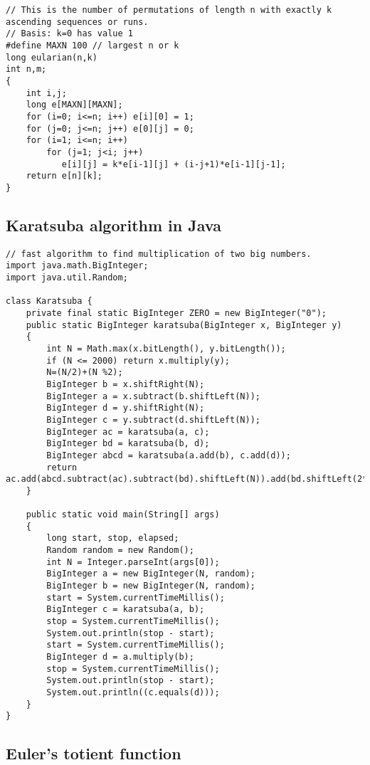 \documentclass[a4paper]{article}
\begin{document}
\begin{verbatim}
// This is the number of permutations of length n with exactly k ascending sequences or runs.
// Basis: k=0 has value 1
#define MAXN 100 // largest n or k
long eularian(n,k)
int n,m;
{
    int i,j;
    long e[MAXN][MAXN];
    for (i=0; i<=n; i++) e[i][0] = 1;
    for (j=0; j<=n; j++) e[0][j] = 0;
    for (i=1; i<=n; i++)
        for (j=1; j<i; j++)
           e[i][j] = k*e[i-1][j] + (i-j+1)*e[i-1][j-1];
    return e[n][k];
}
\end{verbatim}

\subsection{Karatsuba algorithm in Java}

\begin{verbatim}
// fast algorithm to find multiplication of two big numbers.
import java.math.BigInteger;
import java.util.Random;

class Karatsuba {
	private final static BigInteger ZERO = new BigInteger("0");
	public static BigInteger karatsuba(BigInteger x, BigInteger y)
	{
		int N = Math.max(x.bitLength(), y.bitLength());
		if (N <= 2000) return x.multiply(y);
		N=(N/2)+(N %2);
		BigInteger b = x.shiftRight(N);
		BigInteger a = x.subtract(b.shiftLeft(N));
		BigInteger d = y.shiftRight(N);
		BigInteger c = y.subtract(d.shiftLeft(N));
		BigInteger ac = karatsuba(a, c);
		BigInteger bd = karatsuba(b, d);
		BigInteger abcd = karatsuba(a.add(b), c.add(d));
		return ac.add(abcd.subtract(ac).subtract(bd).shiftLeft(N)).add(bd.shiftLeft(2*N));
	}
	
	public static void main(String[] args)
	{
		long start, stop, elapsed;
		Random random = new Random();
		int N = Integer.parseInt(args[0]);
		BigInteger a = new BigInteger(N, random);
		BigInteger b = new BigInteger(N, random);
		start = System.currentTimeMillis();
		BigInteger c = karatsuba(a, b);
		stop = System.currentTimeMillis();
		System.out.println(stop - start);
		start = System.currentTimeMillis();
		BigInteger d = a.multiply(b);
		stop = System.currentTimeMillis();
		System.out.println(stop - start);
		System.out.println((c.equals(d)));
	}
}
\end{verbatim}

\subsection{Euler's totient function}
\end{document}
